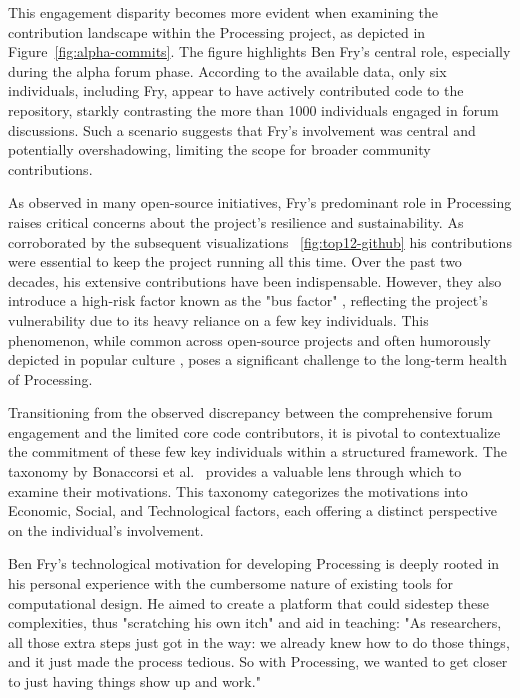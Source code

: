 This engagement disparity becomes more evident when examining the contribution landscape within the Processing project, as depicted in Figure~\ref{fig:alpha-commits}. The figure highlights Ben Fry's central role, especially during the alpha forum phase. According to the available data, only six individuals, including Fry, appear to have actively contributed code to the repository, starkly contrasting the more than 1000 individuals engaged in forum discussions. Such a scenario suggests that Fry's involvement was central and potentially overshadowing, limiting the scope for broader community contributions. 

As observed in many open-source initiatives, Fry's predominant role in Processing raises critical concerns about the project's resilience and sustainability. As corroborated by the subsequent visualizations ~\ref{fig:top12-github} his contributions were essential to keep the project running all this time. Over the past two decades, his extensive contributions have been indispensable. However, they also introduce a high-risk factor known as the "bus factor" \parencite{BusFactor2023}, reflecting the project's vulnerability due to its heavy reliance on a few key individuals. This phenomenon, while common across open-source projects and often humorously depicted in popular culture \parencite{munroeDependency2020}, poses a significant challenge to the long-term health of Processing.

Transitioning from the observed discrepancy between the comprehensive forum engagement and the limited core code contributors, it is pivotal to contextualize the commitment of these few key individuals within a structured framework. The taxonomy by Bonaccorsi et al.~\cite{bonaccorsiComparingMotivationsIndividual2006} provides a valuable lens through which to examine their motivations. This taxonomy categorizes the motivations into Economic, Social, and Technological factors, each offering a distinct perspective on the individual's involvement.

Ben Fry's technological motivation for developing Processing is deeply rooted in his personal experience with the cumbersome nature of existing tools for computational design. He aimed to create a platform that could sidestep these complexities, thus "scratching his own itch" and aid in teaching: "As researchers, all those extra steps just got in the way: we already knew how to do those things, and it just made the process tedious. So with Processing, we wanted to get closer to just having things show up and work." 

